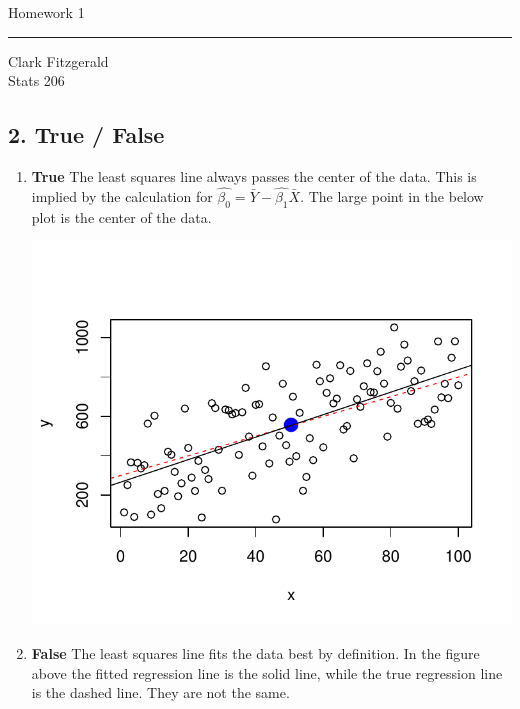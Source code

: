 \documentclass[12pt]{article}
\begin{document}
\begin{center}
    {\Large Homework 1}\\
    \bigskip
    \bigskip
    \hrule
    \medskip
    Clark Fitzgerald\\
    Stats 206
\end{center}

\subsection*{2. True / False}
\begin{enumerate}[label=\alph*]
\item  \textbf{True} The least squares line always passes the center of the data.
This is implied by the calculation for $\hat{\beta_0} = \bar{Y} -
\hat{\beta_1} \bar{X}$.
The large point in the below plot is the center of the data.

\centerline{\includegraphics{regress.pdf}}

\item \textbf{False} The least squares line fits the data
best by definition. In the figure above the fitted regression line is the solid line,
while the true regression line is the dashed line. They are not the same.
\end{enumerate}
\end{document}
